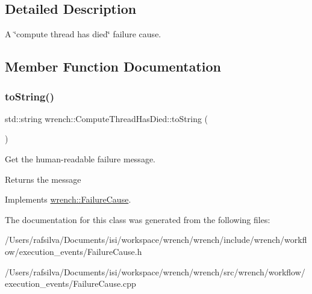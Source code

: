 \subsection{Detailed Description}
A \char`\"{}compute thread has died\char`\"{} failure cause. 

\subsection{Member Function Documentation}
\mbox{\label{classwrench_1_1_compute_thread_has_died_a4725416d9ff31b39ec9d48d23d1c1c0b}} 
\subsubsection{\texorpdfstring{to\+String()}{toString()}}
{\footnotesize\ttfamily std\+::string wrench\+::\+Compute\+Thread\+Has\+Died\+::to\+String (\begin{DoxyParamCaption}{ }\end{DoxyParamCaption})\hspace{0.3cm}{\ttfamily [virtual]}}



Get the human-\/readable failure message. 

\begin{DoxyReturn}{Returns}
the message 
\end{DoxyReturn}


Implements \hyperlink{classwrench_1_1_failure_cause_afbad248ebe902409f2cd4f1d6f2b867d}{wrench\+::\+Failure\+Cause}.



The documentation for this class was generated from the following files\+:\begin{DoxyCompactItemize}
\item 
/\+Users/rafsilva/\+Documents/isi/workspace/wrench/wrench/include/wrench/workflow/execution\+\_\+events/Failure\+Cause.\+h\item 
/\+Users/rafsilva/\+Documents/isi/workspace/wrench/wrench/src/wrench/workflow/execution\+\_\+events/Failure\+Cause.\+cpp\end{DoxyCompactItemize}
